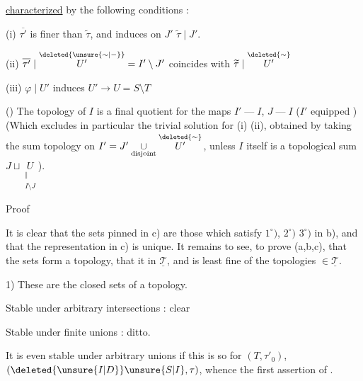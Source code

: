 \uline{characterized} by the following conditions :

(i) $\overline{\tau'}$ is finer than $\widetilde{\tau}$, and induces on $J'$ $\widetilde{\tau}\mid J'$.

(ii) $\overline{\tau'}\mid\overset{\deleted{\unsure{\sim|\mathord{-}}}}{U'}=I'\setminus J'$ coincides with $\widetilde{\tau}\mid\overset{\deleted{\sim}}{U'}$

(iii) $\varphi\mid U'$ induces   $U'\longrightarrow U=S\setminus T$

() The topology of $I$ is a final quotient for the maps $I'\mathbin{\text{---}}I$, $J\mathbin{\text{---}}I$ ($I'$ equipped  ) (Which excludes in particular the trivial solution for (i) (ii), obtained by taking the sum topology on  $I'=J'\underset{\text{disjoint}}{\cup}\overset{\deleted{\sim}}{U'}$, unless $I$ itself is a topological sum $J\sqcup\underset{\substack{\Vert\\I\setminus J}}{U}$).

Proof

  It is clear that the sets pinned in c) are those which satisfy $1^\circ)$, $2^\circ)$ $3^\circ)$ in b), and that the representation in c) is unique. It remains to see, to prove (a,b,c), that the sets form a topology,  that it   in $\underline{\mathscr{T}}$, and is least fine of the topologies $\in\underline{\mathscr{T}}$.

1) These are the closed sets of a topology.

Stable under arbitrary intersections : clear

Stable under finite unions : ditto.

It is even stable under arbitrary unions if this is so for $(T,\tau'_0)$, $(\deleted{\unsure{I|D}}\unsure{S|I},\tau)$, whence the first assertion of .
